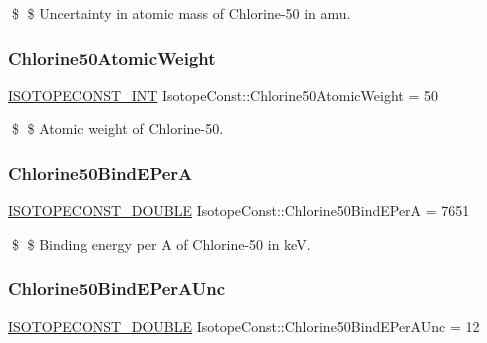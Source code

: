 \$ \$ Uncertainty in atomic mass of Chlorine-\/50 in amu. \mbox{\label{group___isotope_const-_chlorine-_cl50_gac2191304070697f3a178d147774a3203}} 
\subsubsection{\texorpdfstring{Chlorine50\+Atomic\+Weight}{Chlorine50AtomicWeight}}
{\footnotesize\ttfamily \mbox{\hyperlink{group___isotope_const-_macros_ga5f18360b3e99483a35c32d789e62621c}{I\+S\+O\+T\+O\+P\+E\+C\+O\+N\+S\+T\+\_\+\+I\+NT}} Isotope\+Const\+::\+Chlorine50\+Atomic\+Weight = 50}

\$ \$ Atomic weight of Chlorine-\/50. \mbox{\label{group___isotope_const-_chlorine-_cl50_gafa7f43550796fcf972953619bed22c12}} 
\subsubsection{\texorpdfstring{Chlorine50\+Bind\+E\+PerA}{Chlorine50BindEPerA}}
{\footnotesize\ttfamily \mbox{\hyperlink{group___isotope_const-_macros_ga8f45a7272ce02c0b4c65c44636ed719a}{I\+S\+O\+T\+O\+P\+E\+C\+O\+N\+S\+T\+\_\+\+D\+O\+U\+B\+LE}} Isotope\+Const\+::\+Chlorine50\+Bind\+E\+PerA = 7651}

\$ \$ Binding energy per A of Chlorine-\/50 in keV. \mbox{\label{group___isotope_const-_chlorine-_cl50_gaafc2ee8193fccecfad32fb1c2527e102}} 
\subsubsection{\texorpdfstring{Chlorine50\+Bind\+E\+Per\+A\+Unc}{Chlorine50BindEPerAUnc}}
{\footnotesize\ttfamily \mbox{\hyperlink{group___isotope_const-_macros_ga8f45a7272ce02c0b4c65c44636ed719a}{I\+S\+O\+T\+O\+P\+E\+C\+O\+N\+S\+T\+\_\+\+D\+O\+U\+B\+LE}} Isotope\+Const\+::\+Chlorine50\+Bind\+E\+Per\+A\+Unc = 12}


